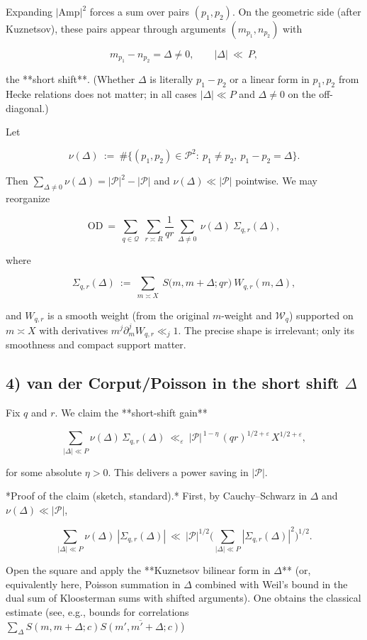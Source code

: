 \documentclass[11pt]{article}
\theoremstyle{definition}
\theoremstyle{remark}
\begin{document}
Expanding $|\mathrm{Amp}|^2$ forces a sum over pairs $(p_1,p_2)$. On the geometric side (after Kuznetsov), these pairs appear through arguments $(m_{p_1},n_{p_2})$ with

$$
m_{p_1}-n_{p_2}=\Delta\ne 0,\qquad |\Delta|\ \ll\ P,
$$

the **short shift**. (Whether $\Delta$ is literally $p_1-p_2$ or a linear form in $p_1,p_2$ from Hecke relations does not matter; in all cases $|\Delta|\ll P$ and $\Delta\ne0$ on the off-diagonal.)

Let

$$
\nu(\Delta)\ :=\ \#\{(p_1,p_2)\in\mathcal P^2:\ p_1\ne p_2,\ p_1-p_2=\Delta\}.
$$

Then $\sum_{\Delta\ne 0}\nu(\Delta)=|\mathcal P|^2-|\mathcal P|$ and $\nu(\Delta)\ll |\mathcal P|$ pointwise. We may reorganize

$$
\mathrm{OD}\ =\ \sum_{q\in\mathcal Q}\;\sum_{r\asymp R}\frac{1}{qr}\,\sum_{\Delta\ne 0}\ \nu(\Delta)\ 
\Sigma_{q,r}(\Delta),
$$

where

$$
\Sigma_{q,r}(\Delta)\ :=\ \sum_{m\asymp X}\ S\!\big(m,m+\Delta;qr\big)\ W_{q,r}(m,\Delta),
$$

and $W_{q,r}$ is a smooth weight (from the original $m$-weight and $\mathcal W_q$) supported on $m\asymp X$ with derivatives $m^j\partial_m^j W_{q,r}\ll_j 1$. The precise shape is irrelevant; only its smoothness and compact support matter.

\subsection*{4) van der Corput/Poisson in the short shift $\Delta$}

Fix $q$ and $r$. We claim the **short-shift gain**

$$
\sum_{|\Delta|\ll P}\nu(\Delta)\,\Sigma_{q,r}(\Delta)
\ \ll_\varepsilon\ |\mathcal P|^{\,1-\eta}\, (qr)^{1/2+\varepsilon}\,X^{1/2+\varepsilon},
$$

for some absolute $\eta>0$. This delivers a power saving in $|\mathcal P|$.

*Proof of the claim (sketch, standard).* First, by Cauchy–Schwarz in $\Delta$ and $\nu(\Delta)\ll|\mathcal P|$,

$$
\sum_{|\Delta|\ll P}\nu(\Delta)\ |\Sigma_{q,r}(\Delta)|
\ \ll\ |\mathcal P|^{1/2}\Big(\sum_{|\Delta|\ll P}|\Sigma_{q,r}(\Delta)|^2\Big)^{1/2}.
$$

Open the square and apply the **Kuznetsov bilinear form in $\Delta$** (or, equivalently here, Poisson summation in $\Delta$ combined with Weil’s bound in the dual sum of Kloosterman sums with shifted arguments). One obtains the classical estimate (see, e.g., bounds for correlations $\sum_{\Delta} S(m,m+\Delta;c)\overline{S(m',m'+\Delta;c)}$)
\end{document}
